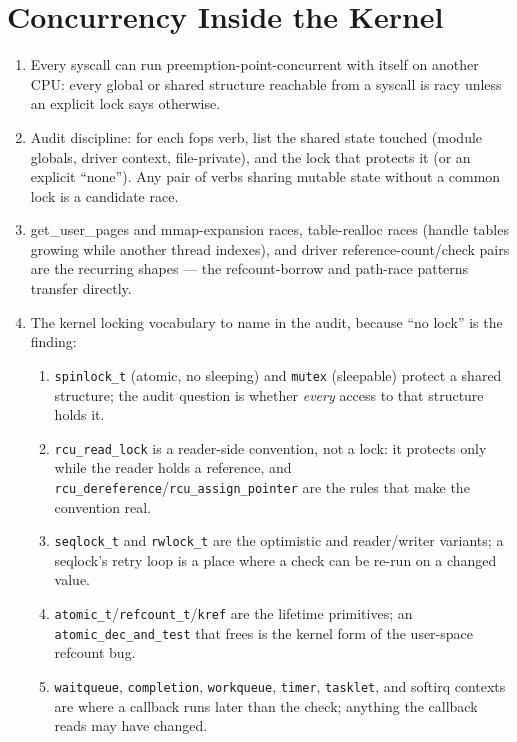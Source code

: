 \documentclass[12pt]{Training}
\begin{document}
\section*{Concurrency Inside the Kernel}
\begin{enumerate}
    \item Every syscall can run preemption-point-concurrent with itself on another CPU: every global or shared structure reachable from a syscall is racy unless an explicit lock says otherwise.
    \item Audit discipline: for each fops verb, list the shared state touched (module globals, driver context, file-private), and the lock that protects it (or an explicit ``none''). Any pair of verbs sharing mutable state without a common lock is a candidate race.
    \item get\_user\_pages and mmap-expansion races, table-realloc races (handle tables growing while another thread indexes), and driver reference-count/check pairs are the recurring shapes --- the refcount-borrow and path-race patterns transfer directly.
    \item The kernel locking vocabulary to name in the audit, because ``no lock'' is the finding:
    \begin{enumerate}
        \item \lstinline{spinlock_t} (atomic, no sleeping) and \lstinline{mutex} (sleepable) protect a shared structure; the audit question is whether \emph{every} access to that structure holds it.
        \item \lstinline{rcu_read_lock} is a reader-side convention, not a lock: it protects only while the reader holds a reference, and \lstinline{rcu_dereference}/\lstinline{rcu_assign_pointer} are the rules that make the convention real.
        \item \lstinline{seqlock_t} and \lstinline{rwlock_t} are the optimistic and reader/writer variants; a seqlock's retry loop is a place where a check can be re-run on a changed value.
        \item \lstinline{atomic_t}/\lstinline{refcount_t}/\lstinline{kref} are the lifetime primitives; an \lstinline{atomic_dec_and_test} that frees is the kernel form of the user-space refcount bug.
        \item \lstinline{waitqueue}, \lstinline{completion}, \lstinline{workqueue}, \lstinline{timer}, \lstinline{tasklet}, and softirq contexts are where a callback runs later than the check; anything the callback reads may have changed.
    \end{enumerate}

\end{enumerate}
\end{document}
